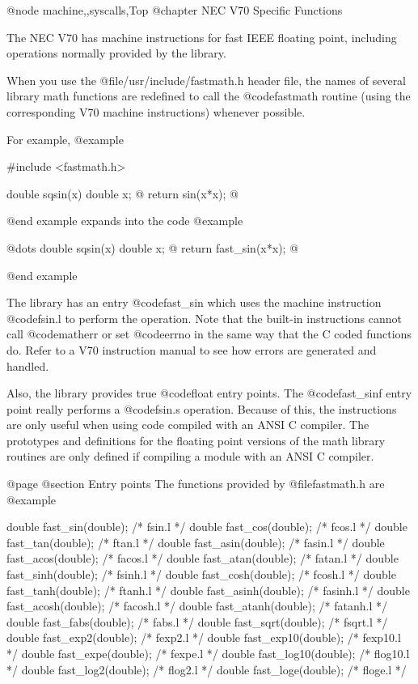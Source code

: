 @node machine,,syscalls,Top
@chapter NEC V70 Specific Functions

The NEC V70 has machine instructions for fast IEEE floating point,
including operations normally provided by the library.  

When you use the @file{/usr/include/fastmath.h} header file, the
names of several library math functions are redefined to call the
@code{fastmath} routine (using the corresponding V70 machine instructions)
whenever possible.

For example,
@example

#include <fastmath.h>

double sqsin(x)
double x;
@{
  return sin(x*x);
@}

@end example
expands into the code
@example

@dots{}
double sqsin(x)
double x;
@{
  return fast_sin(x*x);
@}

@end example

The library has an entry @code{fast_sin} which uses the machine
instruction @code{fsin.l} to perform the operation.  Note that the
built-in instructions cannot call @code{matherr} or set @code{errno}
in the same way that the C coded functions do.  Refer to a V70
instruction manual to see how errors are generated and handled.

Also, the library provides true @code{float} entry points.  The
@code{fast_sinf} entry point really performs a @code{fsin.s}
operation.  Because of this, the instructions are only useful when
using code compiled with an ANSI C compiler.  The prototypes
and definitions for the floating point versions of the math library
routines are only defined if compiling a module with an ANSI C
compiler.

@page
@section Entry points 
The functions provided by @file{fastmath.h} are
@example

 double fast_sin(double);	/*	fsin.l */
 double fast_cos(double);	/*	fcos.l */
 double fast_tan(double);	/*	ftan.l */
 double fast_asin(double);	/*	fasin.l */
 double fast_acos(double);	/*	facos.l */
 double fast_atan(double);	/*	fatan.l */
 double fast_sinh(double);	/*	fsinh.l */
 double fast_cosh(double);	/*	fcosh.l */
 double fast_tanh(double);	/*	ftanh.l */
 double fast_asinh(double);	/*	fasinh.l */
 double fast_acosh(double);	/*	facosh.l */
 double fast_atanh(double);	/*	fatanh.l */
 double fast_fabs(double);	/*	fabs.l */
 double fast_sqrt(double);	/*	fsqrt.l */
 double fast_exp2(double);	/*	fexp2.l */
 double fast_exp10(double);	/*	fexp10.l */
 double fast_expe(double);	/*	fexpe.l */
 double fast_log10(double);	/*	flog10.l */
 double fast_log2(double);	/*	flog2.l */
 double fast_loge(double);	/*	floge.l */


